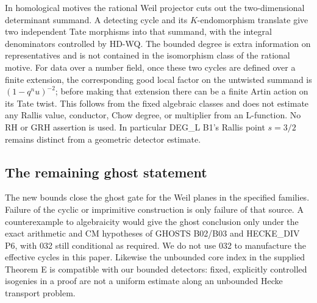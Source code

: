 In homological motives the rational Weil projector cuts out the
two-dimensional determinant summand. A detecting cycle and its
$K$-endomorphism translate give two independent Tate morphisms into
that summand, with the integral denominators controlled by HD-WQ.
The bounded degree is extra information on representatives and is
not contained in the isomorphism class of the rational motive.
For data over a number field, once these two cycles are defined over
a finite extension, the corresponding good local factor on the
untwisted summand is $(1-q^n u)^{-2}$; before making that extension
there can be a finite Artin action on its Tate twist. This follows
from the fixed algebraic classes and does not estimate any Rallis
value, conductor, Chow degree, or multiplier from an L-function.
No RH or GRH assertion is used. In particular DEG\_L B1's Rallis
point $s=3/2$ remains distinct from a geometric detector estimate.

\subsection{The remaining ghost statement}
The new bounds close the ghost gate for the Weil planes in the
specified families. Failure of the cyclic or imprimitive construction
is only failure of that source. A counterexample to algebraicity
would give the ghost conclusion only under the exact arithmetic and
CM hypotheses of GHOSTS B02/B03 and HECKE\_DIV P6, with 032 still
conditional as required. We do not use 032 to manufacture the
effective cycles in this paper. Likewise the unbounded core index
in the supplied Theorem E is compatible with our bounded detectors:
fixed, explicitly controlled isogenies in a proof are not a uniform
estimate along an unbounded Hecke transport problem.
